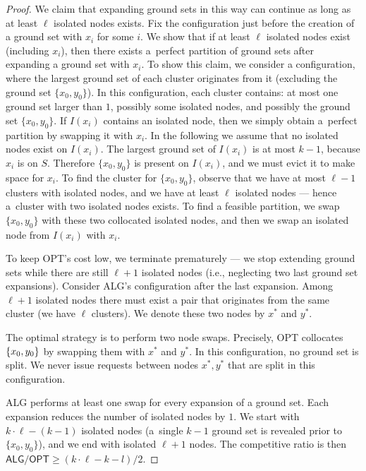\documentclass[a4paper,anonymous,USenglish]{lipics-v2019}
\newcommand{\OPT}{\textsf{OPT}\xspace}
\newcommand{\ALG}{\textsf{ALG}\xspace}
\DeclarePairedDelimiter\set{\{}{\}}
\begin{document}
\begin{proof}
	We claim that expanding ground sets in this way can continue as long as at least $\ell$ isolated nodes exists.
	Fix the configuration just before the creation of a ground set with $x_i$ for some $i$.
	We show that if at least $\ell$ isolated nodes exist (including $x_i$), then there exists a~perfect partition of ground sets after expanding a ground set with $x_i$.
	To show this claim, we consider a configuration, where the largest ground set of each cluster originates from it (excluding the ground set $\{x_0, y_0\}$).
	In this configuration, each cluster contains:  at most one ground set larger than $1$, possibly some isolated nodes, and possibly the ground set $\{x_0, y_0\}$.
	If $I(x_i)$ contains an isolated node, then we simply obtain a~perfect partition by swapping it with $x_i$.
	In the following we assume that no isolated nodes exist on $I(x_i)$.
	The largest ground set of $I(x_i)$ is at most $k-1$, because $x_i$ is on $S$.
	Therefore $\{x_0, y_0\}$ is present on $I(x_i)$, and we must evict it to make space for $x_i$.
	To find the cluster for $\{x_0, y_0\}$, observe that we have at most $\ell-1$ clusters with isolated nodes, and we have at least $\ell$ isolated nodes --- hence a~cluster with two isolated nodes exists.
	To find a feasible partition, we swap $\{x_0, y_0\}$ with these two collocated isolated nodes, and then we swap an isolated node from $I(x_i)$ with $x_i$.
	

	To keep \OPT's cost low, we terminate prematurely --- we stop extending ground sets while there are still $\ell+1$ isolated nodes (i.e., neglecting two last ground set expansions).
	Consider \ALG's configuration after the last expansion.
	Among $\ell+1$ isolated nodes there must exist a pair that originates from the same cluster (we have $\ell$ clusters). 
	We denote these two nodes by $x^*$ and $y^*$.

	The optimal strategy is to perform two node swaps.
	Precisely, \OPT collocates $\set{x_0,y_0}$ by swapping them with $x^*$ and $y^*$.
	In this configuration, no ground set is split.
	We never issue requests between nodes $x^*, y^*$ that are split in this configuration.


	\ALG performs at least one swap for every expansion of a ground set.
	Each expansion reduces the number of isolated nodes by $1$.
	We start with $k \cdot \ell - (k-1)$ isolated nodes (a~single $k-1$ ground set is revealed prior to $\{x_0, y_0\}$), and we end with isolated $\ell+1$ nodes.
	The competitive ratio is then $\ALG / \OPT \geq (k\cdot \ell - k - l) / 2$.
\end{proof}
\end{document}
